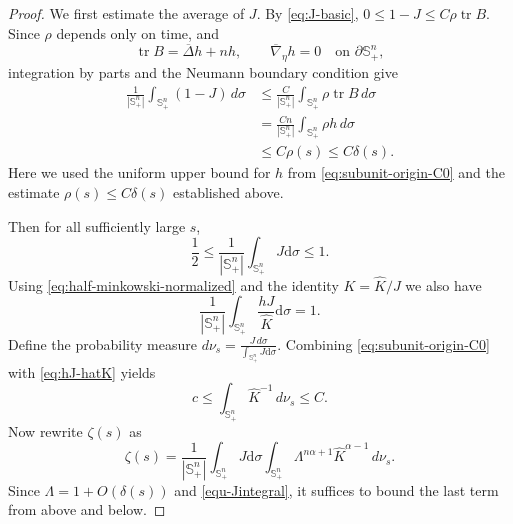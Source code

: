 \documentclass[11pt, reqno]{amsart}
\theoremstyle{remark}
\theoremstyle{definition}
\numberwithin{equation}{section}
\DeclareMathOperator{\tr}{tr}
\begin{document}
\begin{proof}
We first estimate the average of $J$. By \eqref{eq:J-basic}, $0\leq 1-J\leq C\rho\tr B$.   
Since $\rho$ depends only on time, and 
\begin{equation*}
	\tr B=\overline\Delta h+nh,
	\qquad
	\overline\nabla_\eta h=0
	\quad\text{on }\partial\mathbb S^n_+,
\end{equation*}
integration by parts and the Neumann boundary condition
give
\begin{align*}
	\frac{1}{|\mathbb S^n_+|}
	\int_{\mathbb S^n_+}(1-J)\,d\sigma
	&\leq
	\frac{C}{|\mathbb S^n_+|}
	\int_{\mathbb S^n_+}\rho\tr B\,d\sigma\\
	&=
	\frac{Cn}{|\mathbb S^n_+|}
	\int_{\mathbb S^n_+}\rho h\,d\sigma\\
	&\leq C\rho(s)
	\leq C\delta(s).
\end{align*}
Here we used the uniform upper bound for $h$ from
\eqref{eq:subunit-origin-C0} and the estimate $\rho(s)\leq C\delta(s)$
established above. 

Then for all sufficiently large $s$,
\begin{equation}
    \label{equ-Jintegral}
    \dfrac{1}{2} \leq \dfrac{1}{|\mathbb{S}_+^n|}\int_{\mathbb{S}_+^n} J \mathrm{d}\sigma \leq 1.
\end{equation}
Using \eqref{eq:half-minkowski-normalized} and the identity $K=\widehat K/J$ we also have
\begin{equation}\label{eq:hJ-hatK}
        \dfrac{1}{|\mathbb{S}_+^n|}\int_{\mathbb{S}_+^n}\frac{h J}{\widehat K} \mathrm{d}\sigma = 1.
\end{equation}
Define the probability measure $d\nu_s=\frac{J\,d\sigma}{\int_{\mathbb{S}_+^n} J \mathrm{d}\sigma}$.  Combining \eqref{eq:subunit-origin-C0} with \eqref{eq:hJ-hatK} yields
\begin{equation}\label{eq:negative-moment-hatK-section7}
        c\le\int_{\mathbb{S}^n_+}\widehat K^{-1}\,d\nu_s\le C.
\end{equation}
Now rewrite $\zeta(s)$ as
\begin{equation*}
        \zeta(s)=\dfrac{1}{|\mathbb{S}_+^n|}\int_{\mathbb{S}_+^n}  J \mathrm{d}\sigma \int_{\mathbb{S}^n_+}\Lambda^{n\alpha+1}\widehat K^{\alpha-1}\,d\nu_s.
\end{equation*}
Since $\Lambda=1+O(\delta(s))$ and \eqref{equ-Jintegral}, it suffices to bound the last term from above and below.


\end{proof}
\end{document}
